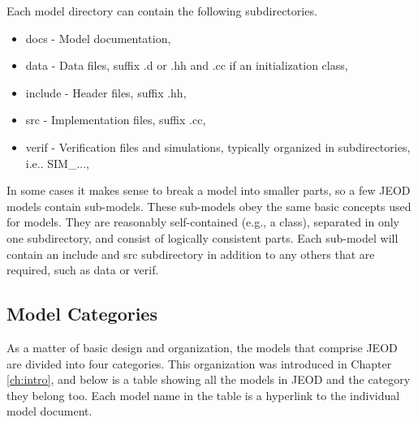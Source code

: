 Each model directory can contain the following subdirectories.
\begin{itemize}
\item docs - Model documentation,
\item data - Data files, suffix .d or .hh and .cc if an initialization class,
\item include - Header files, suffix .hh,
\item src - Implementation files, suffix .cc,
\item verif - Verification files and simulations, typically organized in subdirectories, i.e.. SIM\_...,
\end{itemize}

In some cases it makes sense to break a model into smaller parts, so a few JEOD models contain sub-models.  These sub-models obey the same basic concepts used for models.  They are reasonably self-contained (e.g., a class), separated in only one subdirectory, and consist of logically consistent parts.  Each sub-model will contain an include and src subdirectory in addition to any others that are required, such as data or verif.

\subsection{Model Categories}
As a matter of basic design and organization, the models that comprise JEOD are divided into four categories.  This organization was introduced in Chapter \ref{ch:intro}, and below is a table showing all the models in JEOD and the category they belong too.  Each model name in the table is a hyperlink to the individual model document.

